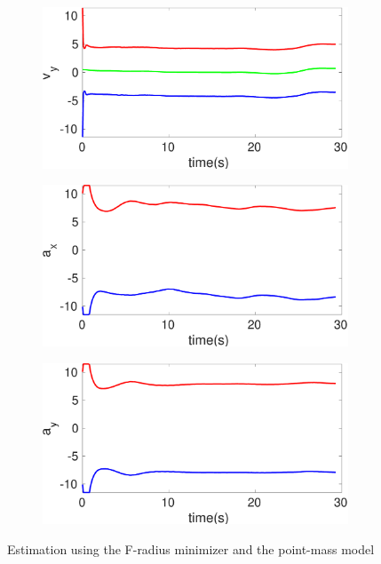 \begin{figure}[h]
\begin{subfigure}{.5\linewidth}
\end{subfigure}
\begin{subfigure}{.5\linewidth}
\centering
\includegraphics[width=\linewidth]{figures/Frad/s3pmSMv_y}
\end{subfigure}
\begin{subfigure}{.5\linewidth}
\centering
\includegraphics[width=\linewidth]{figures/Frad/s3pmSMa_x}
\end{subfigure}
\begin{subfigure}{.5\linewidth}
\centering
\includegraphics[width=\linewidth]{figures/Frad/s3pmSMa_y}
\end{subfigure}
\caption{Estimation using the F-radius minimizer and the point-mass model}
\end{figure}

